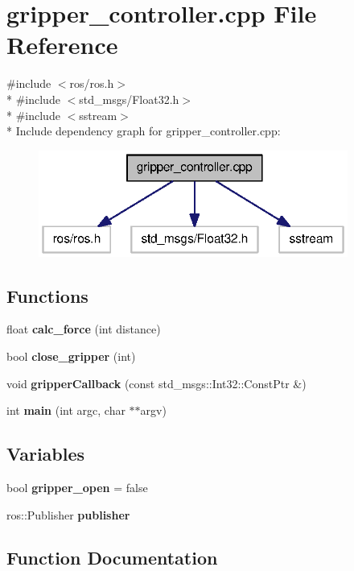 \section{gripper\-\_\-controller.\-cpp File Reference}
\label{gripper__controller_8cpp}
{\ttfamily \#include $<$ros/ros.\-h$>$}\\*
{\ttfamily \#include $<$std\-\_\-msgs/\-Float32.\-h$>$}\\*
{\ttfamily \#include $<$sstream$>$}\\*
Include dependency graph for gripper\-\_\-controller.\-cpp\-:
\nopagebreak
\begin{figure}[H]
\begin{center}
\leavevmode
\includegraphics[width=288pt]{gripper__controller_8cpp__incl}
\end{center}
\end{figure}
\subsection*{Functions}
\begin{DoxyCompactItemize}
\item 
float {\bf calc\-\_\-force} (int distance)
\item 
bool {\bf close\-\_\-gripper} (int)
\item 
void {\bf gripper\-Callback} (const std\-\_\-msgs\-::\-Int32\-::\-Const\-Ptr \&)
\item 
int {\bf main} (int argc, char $\ast$$\ast$argv)
\end{DoxyCompactItemize}
\subsection*{Variables}
\begin{DoxyCompactItemize}
\item 
bool {\bf gripper\-\_\-open} = false
\item 
ros\-::\-Publisher {\bf publisher}
\end{DoxyCompactItemize}


\subsection{Function Documentation}
